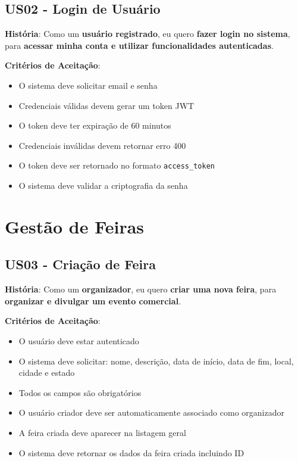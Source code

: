 \documentclass[12pt,a4paper]{article}
\begin{document}
\subsection{US02 - Login de Usuário}

\textbf{História}: Como um \textbf{usuário registrado}, eu quero \textbf{fazer login no sistema}, para \textbf{acessar minha conta e utilizar funcionalidades autenticadas}.

\textbf{Critérios de Aceitação}:
\begin{itemize}
    \item O sistema deve solicitar email e senha
    \item Credenciais válidas devem gerar um token JWT
    \item O token deve ter expiração de 60 minutos
    \item Credenciais inválidas devem retornar erro 400
    \item O token deve ser retornado no formato \texttt{access\_token}
    \item O sistema deve validar a criptografia da senha
\end{itemize}

\section{Gestão de Feiras}

\subsection{US03 - Criação de Feira}

\textbf{História}: Como um \textbf{organizador}, eu quero \textbf{criar uma nova feira}, para \textbf{organizar e divulgar um evento comercial}.

\textbf{Critérios de Aceitação}:
\begin{itemize}
    \item O usuário deve estar autenticado
    \item O sistema deve solicitar: nome, descrição, data de início, data de fim, local, cidade e estado
    \item Todos os campos são obrigatórios
    \item O usuário criador deve ser automaticamente associado como organizador
    \item A feira criada deve aparecer na listagem geral
    \item O sistema deve retornar os dados da feira criada incluindo ID
\end{itemize}
\end{document}
